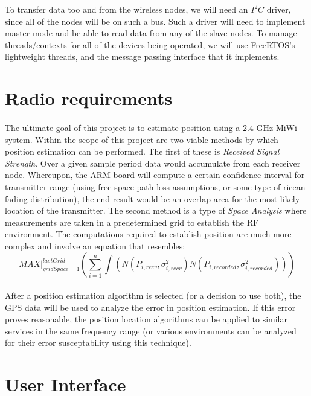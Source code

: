 \documentclass{article}
\begin{document}
To transfer data too and from the wireless nodes, we will need an $I^2C$ driver,
since all of the nodes will be on such a bus.  Such a driver will need to
implement master mode and be able to read data from any of the slave nodes.  To
manage threads/contexts for all of the devices being operated, we will use
FreeRTOS's lightweight threads, and the message passing interface that it
implements.

\section*{Radio requirements}
\paragraph*{}
The ultimate goal of this project is to estimate position using a 2.4 GHz MiWi system.  Within the scope of this project are two viable methods by which position estimation can be performed.  The first of these is \textit{Received Signal Strength}.  Over a given sample period data would accumulate from each receiver node.  Whereupon, the ARM board will compute a certain confidence interval for transmitter range (using free space path loss assumptions, or some type of ricean fading distribution), the end result would be an overlap area for the most likely location of the transmitter.  The second method is a type of \textit{Space Analysis} where measurements are taken in a predetermined grid to establish the RF environment.  The computations required to establish position are much more complex and involve an equation that resembles:
\begin{equation}
 MAX\vert_{gridSpace = 
1}^{lastGrid}\left(\sum_{i=1}^{n}\int\left(N(\overline{P_{i,recv}},\sigma_{i,recv}^{2})N(\overline{P_{i,recorded}},\sigma_{i,recorded}^{2})\right)\right)
\end{equation}
\paragraph*{}
After a position estimation algorithm is selected (or a decision to use both), the GPS data will be used to analyze the error in position estimation.  If this error proves reasonable, the position location algorithms can be applied to similar services in the same frequency range (or various environments can be analyzed for their error susceptability using this technique).

\section*{User Interface}
\end{document}
